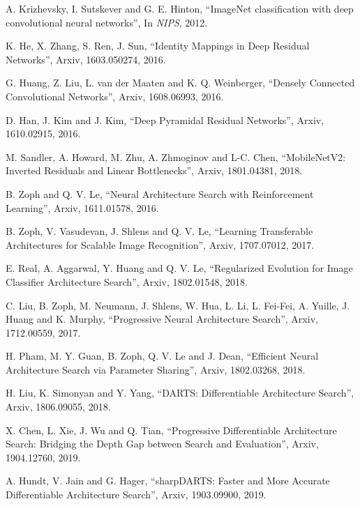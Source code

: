 \documentclass[conference]{IEEEtran}
\begin{document}
\begin{thebibliography}{00}
	
	\small
	
	
	 A. Krizhevsky, I. Sutskever and G. E. Hinton, ``ImageNet classification with deep convolutional neural networks'', In \textit{NIPS}, 2012.
	
	 K. He, X. Zhang, S. Ren, J. Sun, ``Identity Mappings in Deep Residual Networks'', Arxiv, 1603.050274, 2016.
	
	 G. Huang, Z. Liu, L. van der Maaten and K. Q. Weinberger, ``Densely Connected Convolutional Networks'', Arxiv, 1608.06993, 2016.
	
	 D. Han, J. Kim and J. Kim, ``Deep Pyramidal Residual Networks'', Arxiv, 1610.02915, 2016.
	
	 M. Sandler, A. Howard, M. Zhu, A. Zhmoginov and L-C. Chen, ``MobileNetV2: Inverted Residuals and Linear Bottlenecks'', Arxiv, 1801.04381, 2018.
	
	
	 B. Zoph and Q. V. Le, ``Neural Architecture Search with Reinforcement Learning'', Arxiv, 1611.01578, 2016.
	
	 B. Zoph, V. Vasudevan, J. Shlens and Q. V. Le, ``Learning Transferable Architectures for Scalable Image Recognition'', Arxiv, 1707.07012, 2017.
	
	 E. Real, A. Aggarwal, Y. Huang and Q. V. Le, ``Regularized Evolution for Image Classifier Architecture Search'', Arxiv, 1802.01548, 2018.
	
	 C. Liu, B. Zoph, M. Neumann, J. Shlens, W. Hua, L. Li, L. Fei-Fei, A. Yuille, J. Huang and K. Murphy, ``Progressive Neural Architecture Search'', Arxiv, 1712.00559, 2017.
	
	 H. Pham, M. Y. Guan, B. Zoph, Q. V. Le and J. Dean, ``Efficient Neural Architecture Search via Parameter Sharing'', Arxiv, 1802.03268, 2018.
	
	 H. Liu, K. Simonyan and Y. Yang, ``DARTS: Differentiable Architecture Search'', Arxiv, 1806.09055, 2018.
	
	 X. Chen, L. Xie, J. Wu and Q. Tian, ``Progressive Differentiable Architecture Search: Bridging the Depth Gap between Search and Evaluation'', Arxiv, 1904.12760, 2019.
	
	 A. Hundt, V. Jain and G. Hager, ``sharpDARTS: Faster and More Accurate Differentiable Architecture Search'', Arxiv, 1903.09900, 2019.
	

\end{thebibliography}
\end{document}
